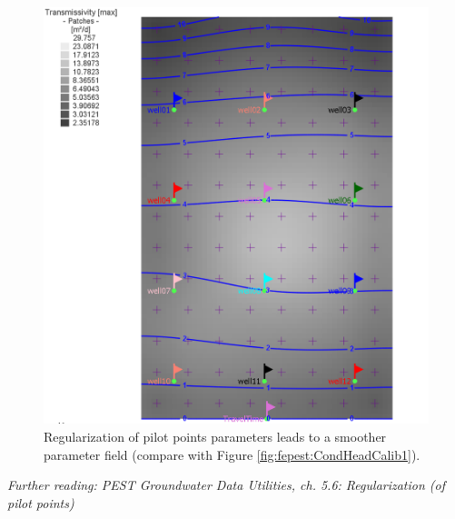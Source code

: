 \begin{figure}
	\center
 \includegraphics[width=\columnwidth]{figures/CondHeadRegularized.png}
\caption{Regularization of pilot points parameters leads to a smoother parameter field (compare with Figure \ref{fig:fepest:CondHeadCalib1}).}
\label{fig:fepest:CondHeadRegularized}
\end{figure}


\textit{Further reading: PEST Groundwater Data Utilities, ch. 5.6: Regularization (of pilot points)}





